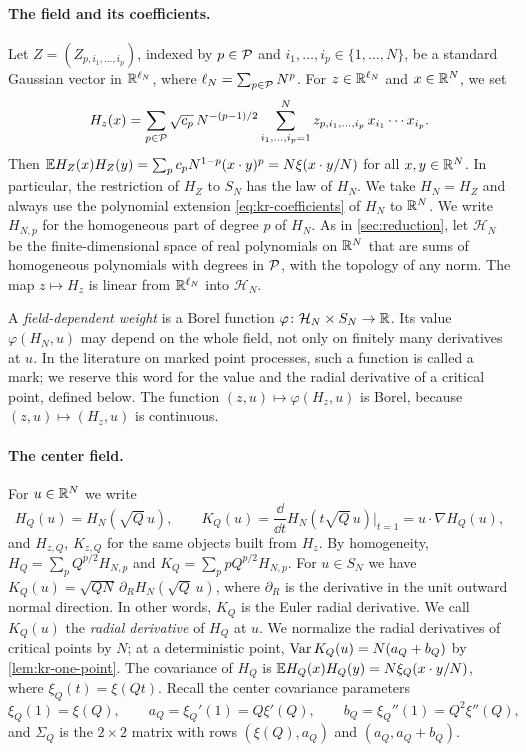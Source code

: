 \paragraph{The field and its coefficients.}
Let $Z=(Z_{p,i_1,\dots,i_p})$, indexed by $p\in\mathcal P$ and $i_1,\dots,i_p\in\{1,\dots,N\}$, be a standard Gaussian vector in $\mathbb R^{\ell_N}$, where $\ell_N=\sum_{p\in\mathcal P}N^p$. For $z\in\mathbb R^{\ell_N}$ and $x\in\mathbb R^N$, we set
\begin{equation}\label{eq:kr-coefficients}
H_z(x)=\sum_{p\in\mathcal P}\sqrt{c_p}\,N^{-(p-1)/2}\sum_{i_1,\dots,i_p=1}^N z_{p,i_1,\dots,i_p}\,x_{i_1}\cdots x_{i_p}.
\end{equation}
Then $\mathbb E H_Z(x)H_Z(y)=\sum_pc_pN^{1-p}(x\cdot y)^p=N\xi(x\cdot y/N)$ for all $x,y\in\mathbb R^N$. In particular, the restriction of $H_Z$ to $S_N$ has the law of $H_N$. We take $H_N=H_Z$ and always use the polynomial extension \eqref{eq:kr-coefficients} of $H_N$ to $\mathbb R^N$. We write $H_{N,p}$ for the homogeneous part of degree $p$ of $H_N$. As in \cref{sec:reduction}, let $\mathcal H_N$ be the finite-dimensional space of real polynomials on $\mathbb R^N$ that are sums of homogeneous polynomials with degrees in $\mathcal P$, with the topology of any norm. The map $z\mapsto H_z$ is linear from $\mathbb R^{\ell_N}$ into $\mathcal H_N$.

A \emph{field-dependent weight} is a Borel function $\varphi\colon\mathcal H_N\times S_N\to\mathbb R$. Its value $\varphi(H_N,u)$ may depend on the whole field, not only on finitely many derivatives at $u$. In the literature on marked point processes, such a function is called a mark; we reserve this word for the value and the radial derivative of a critical point, defined below. The function $(z,u)\mapsto\varphi(H_z,u)$ is Borel, because $(z,u)\mapsto(H_z,u)$ is continuous.

\paragraph{The center field.}
For $u\in\mathbb R^N$ we write
\[
H_Q(u)=H_N(\sqrt Q\,u),\qquad K_Q(u)=\frac{\dd}{\dd t}H_N(t\sqrt Q\,u)\Big|_{t=1}=u\cdot\nabla H_Q(u),
\]
and $H_{z,Q}$, $K_{z,Q}$ for the same objects built from $H_z$. By homogeneity, $H_Q=\sum_pQ^{p/2}H_{N,p}$ and $K_Q=\sum_ppQ^{p/2}H_{N,p}$. For $u\in S_N$ we have $K_Q(u)=\sqrt{QN}\,\partial_RH_N(\sqrt Q\,u)$, where $\partial_R$ is the derivative in the unit outward normal direction. In other words, $K_Q$ is the Euler radial derivative. We call $K_Q(u)$ the \emph{radial derivative} of $H_Q$ at $u$. We normalize the radial derivatives of critical points by $N$; at a deterministic point, $\operatorname{Var} K_Q(u)=N(a_Q+b_Q)$ by \cref{lem:kr-one-point}. The covariance of $H_Q$ is $\mathbb E H_Q(x)H_Q(y)=N\xi_Q(x\cdot y/N)$, where $\xi_Q(t)=\xi(Qt)$. Recall the center covariance parameters
\[
\xi_Q(1)=\xi(Q),\qquad a_Q=\xi_Q'(1)=Q\xi'(Q),\qquad b_Q=\xi_Q''(1)=Q^2\xi''(Q),
\]
and $\Sigma_Q$ is the $2\times2$ matrix with rows $(\xi(Q),a_Q)$ and $(a_Q,a_Q+b_Q)$.

